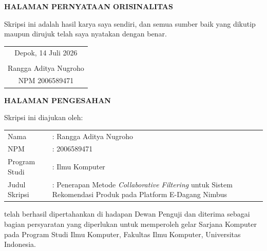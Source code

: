 \documentclass[12pt,a4paper]{report}
\begin{document}
\newpage
\thispagestyle{plain}
\begin{center}
{\bfseries\color{uinavy}\large HALAMAN PERNYATAAN ORISINALITAS}
\end{center}
\vspace{1.2cm}

\noindent
Skripsi ini adalah hasil karya saya sendiri, dan semua sumber baik yang dikutip
maupun dirujuk telah saya nyatakan dengan benar.

\vspace{2.5cm}
\begin{flushright}
\begin{tabular}{c}
Depok, 14 Juli 2026 \\[2.4cm]
\underline{\hspace{5cm}} \\
Rangga Aditya Nugroho \\
NPM 2006589471
\end{tabular}
\end{flushright}

\newpage
\thispagestyle{plain}
\begin{center}
{\bfseries\color{uinavy}\large HALAMAN PENGESAHAN}
\end{center}
\vspace{0.6cm}

\noindent
Skripsi ini diajukan oleh:
\begin{center}
\begin{tabularx}{0.85\textwidth}{@{}p{4cm}X@{}}
Nama & : Rangga Aditya Nugroho \\
NPM & : 2006589471 \\
Program Studi & : Ilmu Komputer \\
Judul Skripsi & : Penerapan Metode \emph{Collaborative Filtering} untuk Sistem
  Rekomendasi Produk pada Platform E-Dagang Nimbus \\
\end{tabularx}
\end{center}

\vspace{0.4cm}
\noindent
telah berhasil dipertahankan di hadapan Dewan Penguji dan diterima sebagai
bagian persyaratan yang diperlukan untuk memperoleh gelar Sarjana Komputer
pada Program Studi Ilmu Komputer, Fakultas Ilmu Komputer, Universitas
Indonesia.
\end{document}
